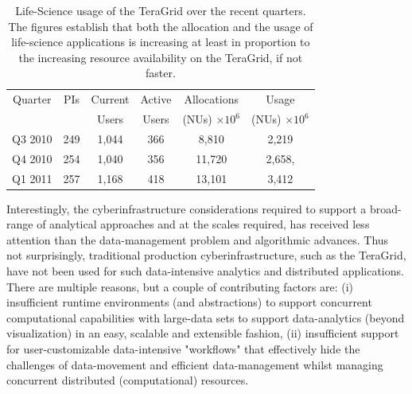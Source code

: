 \documentclass{sig-alternate}
\begin{document}
\begin{table}
 \small
\begin{tabular}{|c|c|c|c|c|c|} 
  \hline  Quarter & PIs & Current & Active & Allocations  & Usage\\
  & & Users  &  Users & (NUs) $\times 10^6$& (NUs) $\times 10^6$ \\ \hline
  Q3 2010 & 249 & 1,044 & 366 & 8,810   & 2,219  \\ \hline
  Q4 2010 & 254 & 1,040 & 356 & 11,720  & 2,658, \\ \hline
  Q1 2011 & 257 & 1,168 & 418 & 13,101  & 3,412\\ \hline 
\end{tabular} 
\caption{Life-Science usage of the TeraGrid over the recent
  quarters. The figures establish that both the  allocation and the
  usage of life-science applications is increasing at least in
  proportion to the increasing resource availability on the TeraGrid,
  if not faster.}
 \label{tg2011} 
\end{table}


 

Interestingly, the cyberinfrastructure considerations required to
support a broad-range of analytical approaches and at the scales
required, has received less attention than the data-management problem
and algorithmic advances.  Thus not surprisingly, traditional
production cyberinfrastructure, such as the TeraGrid, have not been
used for such data-intensive analytics and distributed
applications. There are multiple reasons, but a couple of contributing
factors are: (i) insufficient runtime environments (and abstractions)
to support concurrent computational capabilities with large-data sets
to support data-analytics (beyond visualization) in an easy, scalable
and extensible fashion, (ii) insufficient support for
user-customizable data-intensive "workflows" that effectively hide the
challenges of data-movement and efficient data-management whilst
managing concurrent distributed (computational) resources.

\end{document}
